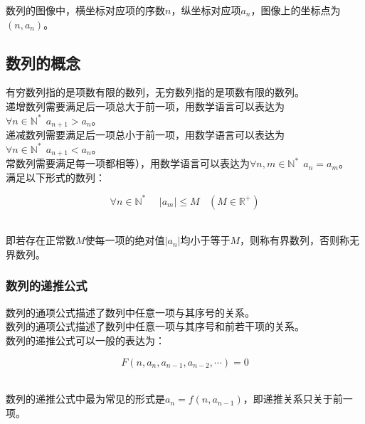 \documentclass[UTF8]{ctexart}
\begin{document}
    数列的图像中，横坐标对应项的序数$n$，纵坐标对应项$a_n$，图像上的坐标点为$(n,a_n)$。

\newpage

\subsection{数列的概念}
    有穷数列指的是项数有限的数列，无穷数列指的是项数有限的数列。\\[3mm]
    递增数列需要满足后一项总大于前一项，用数学语言可以表达为$\forall n\in\mathbb{N^*}~~a_{n+1}>a_{n}$。\\[3mm]
    递减数列需要满足后一项总小于前一项，用数学语言可以表达为$\forall n\in\mathbb{N^*}~~a_{n+1}<a_{n}$。\\[3mm]
    常数列需要满足每一项都相等），用数学语言可以表达为$\forall n,m\in\mathbb{N^*}~~a_n=a_m$。\\[3mm]
    满足以下形式的数列：
    \begin{large}
        \begin{equation*}
            \forall n\in\mathbb{N^*}~~~~~~|a_m|\leq M~~~~(M\in\mathbb{R^+})
        \end{equation*}
    \end{large}\\
    即若存在正常数$M$使每一项的绝对值$|a_n|$均小于等于$M$，则称有界数列，否则称无界数列。\vspace{5pt}

\subsubsection{数列的递推公式}
    数列的通项公式描述了数列中任意一项与其序号的关系。\\[3mm]
    数列的通项公式描述了数列中任意一项与其序号和前若干项的关系。\\[3mm]
    数列的递推公式可以一般的表达为：
    \begin{large}
        \begin{equation*}
            F(n,a_n,a_{n-1},a_{n-2},\cdots)=0
        \end{equation*}
    \end{large}\\
    数列的递推公式中最为常见的形式是$a_n=f(n,a_{n-1})$，即递推关系只关于前一项。\vspace{3pt}
\end{document}
